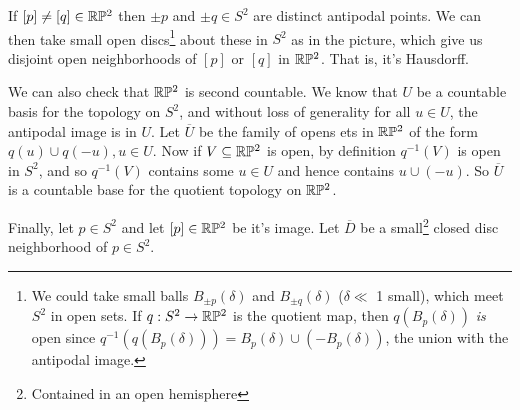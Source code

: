 \documentclass[a4paper]{scrartcl}
\begin{document}
\begin{example}
\begin{center}
        
            \end{center}
        

    If $[p] \neq [q] \in \mathbb{R}\mathbb{P}^2$ then $\pm p$ and $\pm q \in S^2$ are distinct antipodal points. We can then take small open discs\footnote{We could take small balls $B_{\pm p}(\delta)$ and $B_{\pm q}(\delta)$ ($\delta \ll$ 1 small), which meet $S^2$ in open sets. If $q: S^2 \rightarrow \mathbb{R}\mathbb{P}^2$ is the quotient map, then $q(B_{p}(\delta))$ \emph{is} open since $q^{-1}(q(B_{p}(\delta))) = B_{p}(\delta) \cup (-B_{p}(\delta))$, the union with the antipodal image.} about these in $S^2$ as in the picture, which give us disjoint open neighborhoods of $[p]$ or $[q]$ in $\mathbb{R} \mathbb{P}^2$. That is, it's Hausdorff.

    We can also check that $\mathbb{R}\mathbb{P}^2$ is second countable. We know that $U$ be a countable basis for the topology on $S^2$, and without loss of generality for all $u \in U$, the antipodal image is in $U$.
    Let $\overline{U}$ be the family of opens ets in $\mathbb{R}\mathbb{P}^2$ of the form $q(u) \cup q(-u), u \in U$.
    Now if $V \subseteq \mathbb{R}\mathbb{P}^2$ is open, by definition $q^{-1}(V)$ is open in $S^2$, and so $q^{-1}(V)$ contains some $u \in U$ and hence contains $u \cup (-u)$. So $\overline{U}$ is a countable base for the quotient topology on $\mathbb{R}\mathbb{P}^2$.

    Finally, let $p \in S^2$ and let $[p] \in \mathbb{R}\mathbb{P}^2$ be it's image.
    Let $\overline{D}$ be a small\footnote{Contained in an open hemisphere} closed disc neighborhood of $p \in S^2$.

    \begin{center}
        

  


\end{center}
\end{example}
\end{document}
